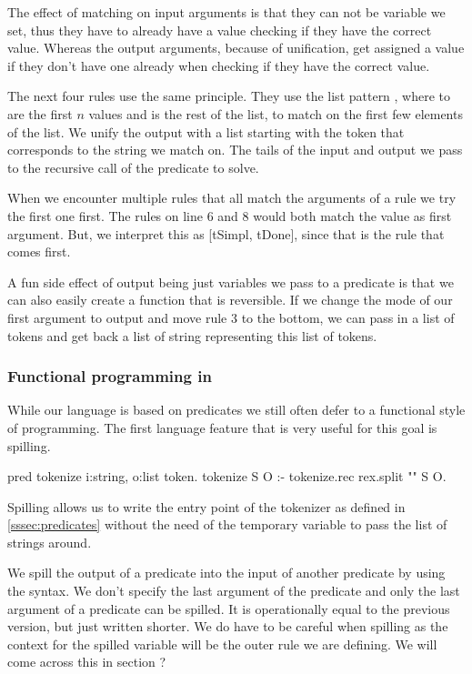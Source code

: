 \documentclass[thesis.tex]{subfiles}
\begin{document}
{{{The effect of matching on input arguments is that they can not be variable we set, thus they have to already have a value checking if they have the correct value. Whereas the output arguments, because of unification, get assigned a value if they don't have one already when checking if they have the correct value.

The next four rules use the same principle. They use the list pattern \elpiinline{[E1, ..., En | TL]}, where  to  are the first $n$ values and  is the rest of the list, to match on the first few elements of the list. We unify the output with a list starting with the token that corresponds to the string we match on. The tails of the input and output we pass to the recursive call of the predicate to solve.

When we encounter multiple rules that all match the arguments of a rule we try the first one first. The rules on line 6 and 8 would both match the value \elpiinline{["/", "/", "="]} as first argument. But, we interpret this as [tSimpl, tDone], since that is the rule that comes first.

A fun side effect of output being just variables we pass to a predicate is that we can also easily create a function that is reversible. If we change the mode of our first argument to output and move rule 3 to the bottom, we can pass in a list of tokens and get back a list of string representing this list of tokens.

\subsubsection{Functional programming in \elpi}
While our language is based on predicates we still often defer to a functional style of programming. The first language feature that is very useful for this goal is spilling.
\begin{elpicode}
  pred tokenize i:string, o:list token.
  tokenize S O :- tokenize.rec {rex.split "" S} O.
\end{elpicode}
Spilling allows us to write the entry point of the tokenizer as defined in \cref*{sssec:predicates} without the need of the temporary variable to pass the list of strings around.

We spill the output of a predicate into the input of another predicate by using the \elpiinline{{ }} syntax. We don't specify the last argument of the predicate and only the last argument of a predicate can be spilled. It is operationally equal to the previous version, but just written shorter. We do have to be careful when spilling as the context for the spilled variable will be the outer rule we are defining. We will come across this in section ?

}}}
\end{document}
